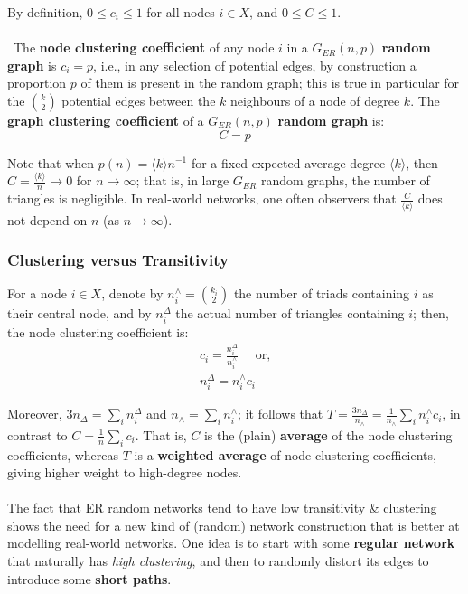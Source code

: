 \documentclass[a4paper,11pt]{article}
\begin{document}
By definition,  $0 \leq c_i \leq 1$ for all nodes $i \in X$, and $0 \leq C \leq 1$.
\\\\\
The \textbf{node clustering coefficient} of any node $i$ in a $G_{ER}(n,p)$ \textbf{random graph} is $c_i = p$, i.e., in any selection of potential edges, by construction a proportion $p$ of them is present in the random graph;
this is true in particular for the $\binom{k}{2}$ potential edges between the $k$ neighbours of a node of degree $k$.
The \textbf{graph clustering coefficient} of a $G_{ER}(n,p)$ \textbf{random graph} is:
\[
    C = p
\]

Note that when $p(n) = \langle k \rangle n^{-1}$ for a fixed expected average degree $\langle k \rangle$, then $C = \frac{\langle k \rangle}{n} \to 0$ for $n \to \infty$;
that is, in large $G_{ER}$ random graphs, the number of triangles is negligible.
In real-world networks, one often observers that $\frac{C}{\langle k \rangle}$ does not depend on $n$ (as $n \to \infty$).

\subsubsection{Clustering versus Transitivity}
For a node $i \in X$, denote by $n^\land_i = \binom{k_i}{2}$ the number of triads containing $i$ as their central node, and by $n_i^\Delta$ the actual number of triangles containing $i$;
then, the node clustering coefficient is:
\begin{align*}
    c_i = \frac{n_i^\Delta}{n_i^\land} \quad \text{ or,} \\
    n_i^\Delta = n_i^\land c_i
\end{align*}

Moreover, $3n_\Delta = \sum_i n_i^\Delta$ and $n_\land = \sum_i n_i^\land$;
it follows that $T = \frac{3n_\Delta}{n_\land} = \frac{1}{n_\land} \sum_i n_i^\land c_i$, in contrast to $C = \frac{1}{n} \sum_i c_i$.
That is, $C$ is the (plain) \textbf{average} of the node clustering coefficients, whereas $T$ is a \textbf{weighted average} of node clustering coefficients, giving higher weight to high-degree nodes.
\\\\
The fact that ER random networks tend to have low transitivity \& clustering shows the need for a new kind of (random) network construction that is better at modelling real-world networks.
One idea is to start with some \textbf{regular network} that naturally has \textit{high clustering}, and then to randomly distort its edges to introduce some \textbf{short paths}.
\end{document}
